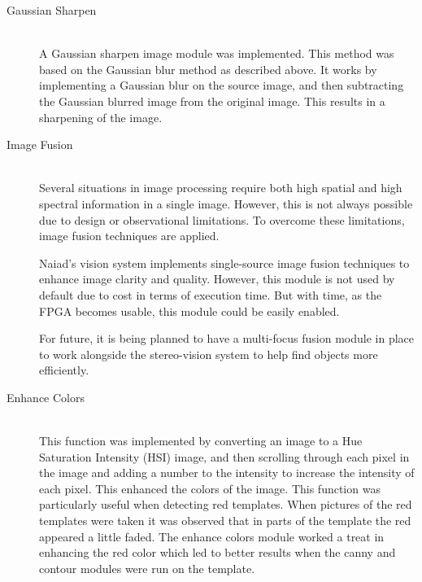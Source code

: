 \begin{description}
\item[Gaussian Sharpen]\hfill \\
A Gaussian sharpen image module was implemented. This method was based on the Gaussian blur method as described above. It works by implementing a Gaussian blur on the source image, and then subtracting the Gaussian blurred image from the original image. This results in a sharpening of the image. 

\item[Image Fusion]\hfill \\
Several situations in image processing require both high spatial and high spectral information in a single image. However, this is not always possible due to design or observational limitations.
To overcome these limitations, image fusion techniques are applied.

Naiad's vision system implements single-source image fusion techniques to enhance image clarity and quality. However, this module is not used by default due to cost in terms of execution time. But with time, as the FPGA becomes usable, this module could be easily enabled.

For future, it is being planned to have a multi-focus fusion module in place to work alongside the stereo-vision system to help find objects more efficiently. 
\cite{article:Zheng2010} \cite{article:Zhang2010} \cite{article:Shutao}

\item[Enhance Colors]\hfill \\
This function was implemented by converting an image to a Hue Saturation Intensity (HSI) image, and then scrolling through each pixel in the image and adding a number to the intensity to increase the intensity of each pixel. This enhanced the colors of the image. This function was particularly useful when detecting red templates. When pictures of the red templates were taken it was observed that in parts of the template the red appeared a little faded. The enhance colors module worked a treat in enhancing the red color which led to better results when the canny and contour modules were run on the template. 
\end{description}


